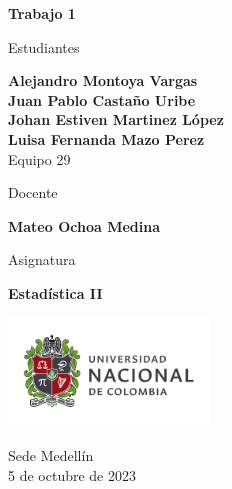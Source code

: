 \begin{titlepage}
   \Large{
   \begin{center}
       \vspace*{1cm}

       \textbf{Trabajo 1}

            
       \vspace{1.5cm}
       
       Estudiantes
       
       \vspace{0.5cm}
        
	\textbf{Alejandro Montoya Vargas}\\    

  \textbf{Juan Pablo Castaño Uribe}\\

	\textbf{Johan Estiven Martinez López}\\

	\textbf{Luisa Fernanda Mazo Perez}\\
	

              \vspace{1cm}
      Equipo 29 
       
       Docente 
       
       \vspace{0.5cm}

       \textbf{Mateo Ochoa Medina}
       
       \vspace{0.4cm}

       \vspace{1.4cm}
       
       Asignatura
       
       \vspace{0.5cm}

       \textbf{Estadística II}

       \vfill

            
     
       \includegraphics[width=0.4\textwidth]{logounal.png}
            
       Sede Medellín\\
       5 de octubre de 2023
       
   \end{center}
   }
\end{titlepage}